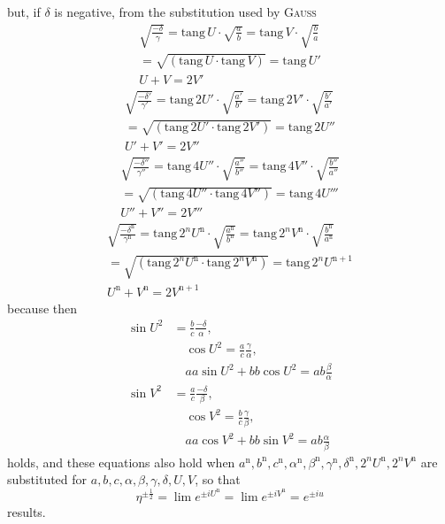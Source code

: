 but, if $\delta$ is negative, from the substitution used by \textsc{Gauss}
\[
\begin{gathered}
\surd{\frac{-\delta}{\gamma}}
=\mathrm{tang}\,U\cdot\surd{\frac ab}
=\mathrm{tang}\,V\cdot\surd{\frac ba}
\\=\surd{(\mathrm{tang}\,U\cdot\mathrm{tang}\,V)}
=\mathrm{tang}\,U'\\
U+V=2V'
\end{gathered}
\]
\[
\begin{gathered}
\surd{\frac{-\delta'}{\gamma'}}
=\mathrm{tang}\,2U'\cdot\surd{\frac{a'}{b'}}
=\mathrm{tang}\,2V'\cdot\surd{\frac{b'}{a'}}
\\=\surd{(\mathrm{tang}\,2U'\cdot\mathrm{tang}\,2V')}
=\mathrm{tang}\,2U''\\
U'+V'=2V''
\end{gathered}
\]
\[
\begin{gathered}
\surd{\frac{-\delta''}{\gamma''}}
=\mathrm{tang}\,4U''\cdot\surd{\frac{a''}{b''}}
=\mathrm{tang}\,4V''\cdot\surd{\frac{b''}{a''}}
\\=\surd{(\mathrm{tang}\,4U''\cdot\mathrm{tang}\,4V'')}
=\mathrm{tang}\,4U'''\\
U''+V''=2V'''
\end{gathered}
\]
\[
\begin{gathered}
\surd{\frac{-\delta^{\mathrm n}}{\gamma^{\mathrm n}}}
=\mathrm{tang}\,2^nU^{\mathrm n}\cdot\surd{\frac{a^{\mathrm n}}{b^{\mathrm n}}}
=\mathrm{tang}\,2^nV^{\mathrm n}\cdot\surd{\frac{b^{\mathrm n}}{a^{\mathrm n}}}
\\=\surd{(\mathrm{tang}\,2^nU^{\mathrm n}\cdot\mathrm{tang}\,2^nV^{\mathrm n})}
=\mathrm{tang}\,2^nU^{\mathrm n+1}\\
U^{\mathrm n}+V^{\mathrm n}=2V^{\mathrm n+1}
\end{gathered}
\]
because then
\[
\begin{aligned}
\sin U^2&=\frac bc\frac{-\delta}{\alpha},\\[4pt]&\quad
\cos U^2=\frac ac\frac\gamma\alpha,\\[4pt]&\quad
aa\sin U^2+bb\cos U^2=ab\frac\beta\alpha\\[4pt]
\sin V^2&=\frac ac\frac{-\delta}{\beta},\\[4pt]&\quad
\cos V^2=\frac bc\frac\gamma\beta,\\[4pt]&\quad
aa\cos V^2+bb\sin V^2=ab\frac\alpha\beta
\end{aligned}
\]
holds, and these equations also hold when $a^{\mathrm n},\allowbreak b^{\mathrm n},\allowbreak c^{\mathrm n},\allowbreak \alpha^{\mathrm n},\allowbreak \beta^{\mathrm n},\allowbreak \gamma^{\mathrm n},\allowbreak \delta^{\mathrm n},\allowbreak 2^nU^{\mathrm n},\allowbreak 2^nV^{\mathrm n}$
are substituted for $a,\allowbreak b,\allowbreak c,\allowbreak \alpha,\allowbreak \beta,\allowbreak \gamma,\allowbreak \delta,\allowbreak U,\allowbreak V$, so that
\[
\eta^{\pm\frac12}
=\lim e^{\pm iU^{\mathrm n}}=\lim e^{\pm iV^{\mathrm n}}=e^{\pm iu}
\]
results.


